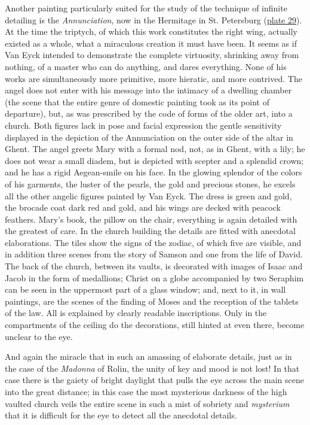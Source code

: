 Another painting particularly suited for the study of the technique of
infinite detailing is the \emph{Annunciation}, now in the Hermitage in
St. Petersburg
(\protect\hyperlink{20_ILLUSTRATIONS_FOLLOW_PAGE.xhtmlux5cux23id_26}{plate
29}). At the time the triptych, of which this work constitutes the right
wing, actually existed as a whole, what a miraculous creation it must
have been. It seems as if Van Eyck intended to demonstrate the complete
virtuosity, shrinking away from nothing, of a master who can do
anything, and dares everything. None of his works are simultaneously
more primitive, more hieratic, and more contrived. The angel does not
enter with his message into the intimacy of a dwelling chamber (the
scene that the entire genre of domestic painting took as its point of
departure), but, as was prescribed by the code of forms of the older
art, into a church. Both figures lack in pose and facial expression the
gentle sensitivity displayed in the depiction of the Annunciation on the
outer side of the altar in Ghent. The angel greets Mary with a formal
nod, not, as in Ghent, with a lily; he does not wear a small diadem, but
is depicted with scepter and a splendid crown; and he has a rigid
Aegean-smile on his face. In the glowing splendor of the colors of his
garments, the luster of the pearls, the gold and precious stones, he
excels all the other angelic figures painted by Van Eyck. The dress is
green and gold, the brocade coat dark red and gold, and his wings are
decked with peacock feathers. Mary's book, the pillow on the chair,
everything is again detailed with the
\protect\hypertarget{21_Chapter_Thirteen__IMAGE_AND_WORD.xhtmlux5cux23page_336}{}{}greatest
of care. In the church building the details are fitted with anecdotal
elaborations. The tiles show the signs of the zodiac, of which five are
visible, and in addition three scenes from the story of Samson and one
from the life of David. The back of the church, between its vaults, is
decorated with images of Isaac and Jacob in the form of medallions;
Christ on a globe accompanied by two Seraphim can be seen in the
uppermost part of a glass window; and, next to it, in wall paintings,
are the scenes of the finding of Moses and the reception of the tablets
of the law. All is explained by clearly readable inscriptions. Only in
the compartments of the ceiling do the decorations, still hinted at even
there, become unclear to the eye.

And again the miracle that in such an amassing of elaborate details,
just as in the case of the \emph{Madonna} of Rolin, the unity of key and
mood is not lost! In that case there is the gaiety of bright daylight
that pulls the eye across the main scene into the great distance; in
this case the most mysterious darkness of the high vaulted church veils
the entire scene in such a mist of sobriety and \emph{mysterium} that it
is difficult for the eye to detect all the anecdotal details.

